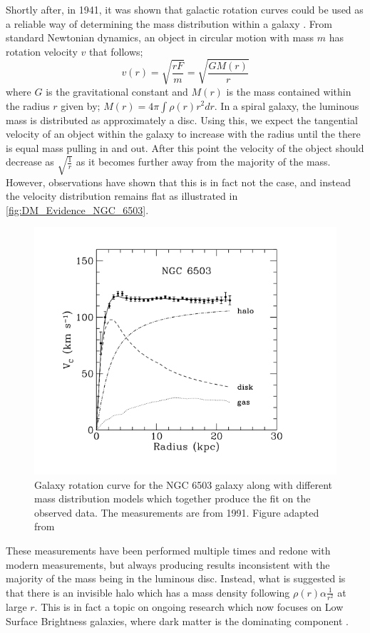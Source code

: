 \par
Shortly after, in 1941, it was shown that galactic rotation curves could be used as a reliable way of determining the mass distribution within a galaxy \cite{Chandrasekhar_1941_ref}.
From standard Newtonian dynamics, an object in circular motion with mass $m$ has rotation velocity $v$ that follows;
\begin{equation}
    v(r) = \sqrt{\frac{rF}{m}} = \sqrt{\frac{GM(r)}{r}}
    \label{eq:Kepler_Motion}
\end{equation}
where $G$ is the gravitational constant and $M(r)$ is the mass contained within the radius $r$ given by; $M(r) = 4 \pi \int \rho(r) r^{2} dr$.
In a spiral galaxy, the luminous mass is distributed as approximately a disc. 
Using this, we expect the tangential velocity of an object within the galaxy to increase with the radius until the there is equal mass pulling in and out.
After this point the velocity of the object should decrease as $\sqrt{\frac{1}{r}}$ as it becomes further away from the majority of the mass.
However, observations have shown that this is in fact not the case, and instead the velocity distribution remains flat as illustrated in \autoref{fig:DM_Evidence_NGC_6503}.
\begin{figure}[!htbp]%
    \centering
    \includegraphics[scale=1.0]{Figures/DarkMatterEvidence/NGC_6503_galaxy_speed.png}
    \caption{Galaxy rotation curve for the NGC 6503 galaxy along with different mass distribution models which together produce the fit on the observed data. The measurements are from 1991. Figure adapted from \cite{NGC_6503_galaxy_rotation_ref}}
    \label{fig:DM_Evidence_NGC_6503}
\end{figure}
These measurements have been performed multiple times and redone with modern measurements, but always producing results inconsistent with the majority of the mass being in the luminous disc.
Instead, what is suggested is that there is an invisible halo which has a mass density following $\rho(r) \alpha \frac{1}{r^2}$ at large $r$.
This is in fact a topic on ongoing research which now focuses on Low Surface Brightness galaxies, where dark matter is the dominating component \cite{MHONGOOSE_2018_ref}.



